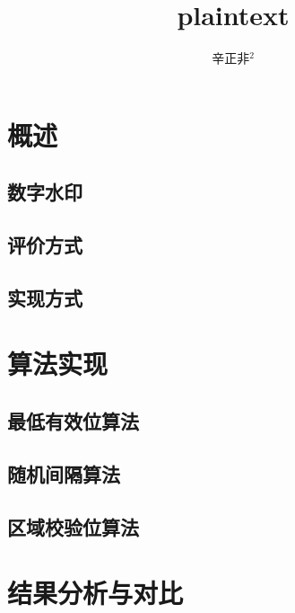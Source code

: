 \documentclass[a4paper,zihao=5,UTF8]{ctexart}
\title{\Large\CJKfamily{zhkai} plaintext}
\author{
        \zihao{-4}
        辛正非$^2$\quad 
    }
\affil{（
    \zihao{-5}
    {上海第二工业大学\quad{}上海\quad{}201209} 
）}
\date{}
\begin{document}
	\maketitle
	{
	}
    
    \noindent{}

    \noindent{}
    \songti{
        
    }

\section{概述}

\subsection{数字水印}

\subsection{评价方式}

\subsection{实现方式}

\section{算法实现}

\subsection{最低有效位算法}

\subsection{随机间隔算法}

\subsection{区域校验位算法}

\section{结果分析与对比}
\end{document}
